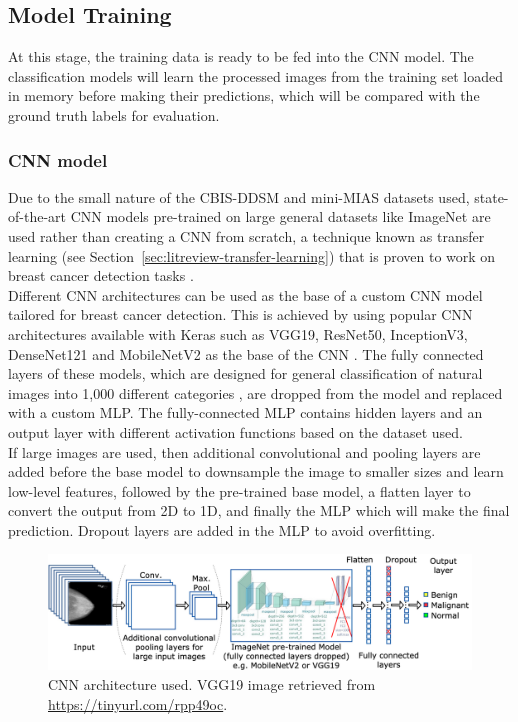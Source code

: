 


\subsection{Model Training}

At this stage, the training data is ready to be fed into the CNN model. The classification models will learn the processed images from the training set loaded in memory before making their predictions, which will be compared with the ground truth labels for evaluation.

\subsubsection{CNN model}
\label{sec:design-cnn-model-decision}

Due to the small nature of the CBIS-DDSM and mini-MIAS datasets used, state-of-the-art CNN models pre-trained on large general datasets like ImageNet are used rather than creating a CNN from scratch, a technique known as transfer learning (see Section~\ref{sec:litreview-transfer-learning}) that is proven to work on breast cancer detection tasks \citep{Shen2017, Falconi2019}.\\

Different CNN architectures can be used as the base of a custom CNN model tailored for breast cancer detection. This is achieved by using popular CNN architectures available with Keras such as VGG19, ResNet50, InceptionV3, DenseNet121 and MobileNetV2 as the base of the CNN \citep{kerasApplications}. The fully connected layers of these models, which are designed for general classification of natural images into 1,000 different categories \citep{Krizhevsky2012}, are dropped from the model and replaced with a custom MLP. The fully-connected MLP contains hidden layers and an output layer with different activation functions based on the dataset used.\\

If large images are used, then additional convolutional and pooling layers are added before the base model to downsample the image to smaller sizes and learn low-level features, followed by the pre-trained base model, a flatten layer to convert the output from 2D to 1D, and finally the MLP which will make the final prediction. Dropout layers are added in the MLP to avoid overfitting.

\begin{figure}[ht]
\centerline{\includegraphics[width=1.2\textwidth]{figures/design/CNN architecture.png}}
\caption{\label{fig:design-CNN architecture}CNN architecture used. VGG19 image retrieved from \url{https://tinyurl.com/rpp49oc}.}
\end{figure}

